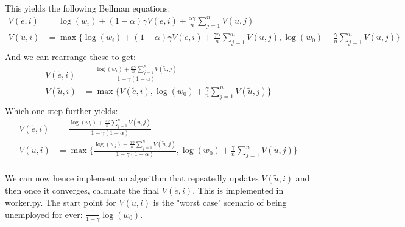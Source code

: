 \documentclass{article}[12pt]
\begin{document}
This yields the following Bellman equations:
\begin{align*}
V(\tilde{e}, i) &= \log(w_i) + (1-\alpha)\gamma V(\tilde{e},i) + \frac{\alpha\gamma}{n} \sum_{j=1}^n V(\tilde{u}, j)\\
V(\tilde{u}, i) &= \max\{\log(w_i) + (1-\alpha)\gamma V(\tilde{e},i) + \frac{\gamma\alpha}{n} \sum_{j=1}^n V(\tilde{u}, j), \log(w_0)+ \frac{\gamma}{n} \sum_{j=1}^n V(\tilde{u}, j)\}\\
\end{align*}
And we can rearrange these to get:
\begin{align*}
V(\tilde{e}, i) &= \frac{\log(w_i) + \frac{\alpha\gamma}{n} \sum_{j=1}^n V(\tilde{u}, j)}{1-\gamma(1-\alpha)}\\
V(\tilde{u}, i)& =  \max\{V(\tilde{e},i), \log(w_0)+ \frac{\gamma}{n} \sum_{j=1}^n V(\tilde{u}, j)\} \\
\end{align*}
Which one step further yields:
\begin{align*}
V(\tilde{e}, i) &= \frac{\log(w_i) + \frac{\alpha\gamma}{n} \sum_{j=1}^n V(\tilde{u}, j)}{1-\gamma(1-\alpha)}\\
V(\tilde{u}, i)& =  \max\{ \frac{\log(w_i) + \frac{\alpha\gamma}{n} \sum_{j=1}^n V(\tilde{u}, j)}{1-\gamma(1-\alpha)}, \log(w_0)+ \frac{\gamma}{n} \sum_{j=1}^n V(\tilde{u}, j)\} \\
\end{align*}

We can now hence implement an algorithm that repeatedly updates $V(\tilde{u}, i)$ and then once it converges, calculate the final $V(\tilde{e}, i)$. This is implemented in worker.py. The start point for $V(\tilde{u}, i)$ is the "worst case" scenario of being unemployed for ever: $\frac{1}{1-\gamma}{\log(w_0)}$.
\end{document}
